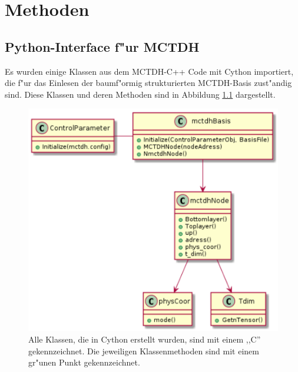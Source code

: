\chapter{Methoden}

\section{Python-Interface f"ur MCTDH}
\label{sec:PyInterface}

Es wurden einige Klassen aus dem MCTDH-C++ Code mit Cython importiert, die f"ur das Einlesen der baumf"ormig strukturierten MCTDH-Basis zust"andig sind.
Diese Klassen und deren Methoden sind in Abbildung \ref{fig:uml_Cython} dargestellt. 

\begin{figure}
    \centering
    \includegraphics[scale=0.6]{figures/sequenceDiagram}
    \caption{Alle Klassen, die in Cython erstellt wurden, sind mit einem ,,C'' gekennzeichnet. Die jeweiligen Klassenmethoden sind mit einem
    gr"unen Punkt gekennzeichnet.}\label{fig:uml_Cython}
\end{figure}


